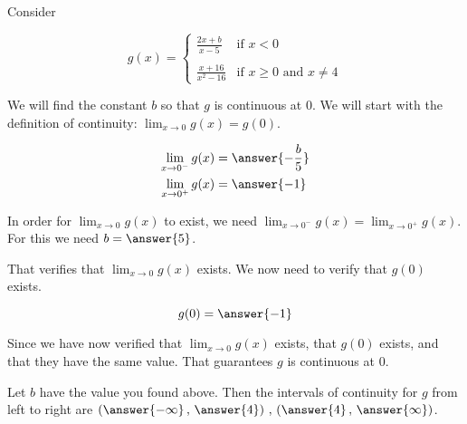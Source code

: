 \documentclass{ximera}
\author{Nela Lakos \and Kyle Parsons \and Bobby Ramsey}
\begin{document}
\begin{exercise}

Consider

\[
g(x) = 
\begin{cases}
\frac{2x+b}{x-5} & \text{if }x<0\\ \\
\frac{x+16}{x^2-16} & \text{if }x\geq0\text{ and }x\neq4
\end{cases}
\]

We will find the constant $b$ so that $g$ is continuous at 0.  We will start with the definition of continuity: $\displaystyle \lim_{x\to0}g(x) = g(0)$.  

\begin{align*}
	\lim_{x\to0^-}g(x) &= \answer{-\frac{b}{5}}\\
	\lim_{x\to0^+} g(x)&= \answer{-1}
\end{align*}


In order for $\lim_{x\to0}g(x)$ to exist, we need $\lim_{x\to0^-}g(x) = \lim_{x\to0^+}g(x)$. For this we need $b = \answer{5}$.  

\begin{exercise}
	That verifies that $\displaystyle \lim_{x\to 0}g(x)$ exists. We now need to verify that $g(0)$ exists.
	
	\[g(0) = \answer{-1}\]



Since we have now verified that $\displaystyle \lim_{x\to0}g(x)$ exists, that $g(0)$ exists, and that they have the same value. That guarantees $g$ is continuous at 0.



\begin{exercise}

Let $b$ have the value you found above.  Then the intervals of continuity for $g$ from left to right are $\left(\answer{-\infty}\, , \,\answer{4}\right)\, , \,\left(\answer{4}\, ,\,\answer{\infty}\right)$.

\end{exercise}
\end{exercise}
\end{exercise}
\end{document}
